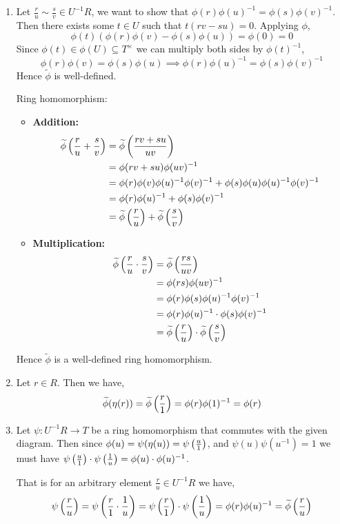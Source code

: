 \documentclass[Notebook.tex]{subfiles}
\begin{document}
\begin{solution}
	\bbni 
	\begin{enumerate}
		\item Let $\frac{r}{u} \sim \frac{s}{v} \in U^{-1}R$, we want to show that $\phi(r) \phi(u)^{-1} = \phi(s)\phi(v)^{-1}$. Then there exists some $t \in U$ such that $t(rv - su) = 0$. Applying ${\phi}$,
		\[\phi(t)(\phi(r) \phi(v) - \phi(s) \phi(u)) = \phi(0) = 0\]
		Since $\phi(t) \in \phi(U) \subseteq T^\times$ we can multiply both sides by $\phi(t)^{-1}$, 
		\[\phi(r) \phi(v) = \phi(s) \phi(u) \implies \phi(r) \phi(u)^{-1} = \phi(s) \phi(v)^{-1} \]
		Hence $\widetilde{\phi}$ is well-defined. 

		Ring homomorphism: 
		\begin{itemize}
			\item \textbf{Addition:}
			\begin{align*}
				\widetilde{\phi}\left (\frac{r}{u}+\frac{s}{v} \right ) &= \widetilde{\phi}\left(\frac{rv + su}{uv}\right) \\
				&= \phi(rv + su) \phi(uv)^{-1} \\
				&= \phi(r)\phi(v)\phi(u)^{-1}\phi(v)^{-1}+\phi(s)\phi(u)\phi(u)^{-1}\phi(v)^{-1} \\ 
				&= \phi(r)\phi(u)^{-1}  + \phi(s) \phi(v)^{-1} \\
				&= \widetilde{\phi}\left(\frac{r}{u}\right) + \widetilde{\phi} \left(\frac{s}{v}\right)
			\end{align*}  
			\item \textbf{Multiplication:}
			\begin{align*}
				\widetilde{\phi}\left (\frac{r}{u} \cdot \frac{s}{v} \right ) &= \widetilde{\phi}\left(\frac{rs}{uv}\right) \\
				&= \phi(rs) \phi(uv)^{-1} \\
				&= \phi(r)\phi(s)\phi(u)^{-1}\phi(v)^{-1} \\
				&= \phi(r)\phi(u)^{-1}  \cdot  \phi(s) \phi(v)^{-1} \\
				&= \widetilde{\phi}\left(\frac{r}{u}\right) \cdot \widetilde{\phi} \left(\frac{s}{v}\right)
			\end{align*}  
		\end{itemize}
		Hence $\widetilde{\phi}$ is a well-defined ring homomorphism. 

		\item Let $r \in R$. Then we have, 
		\[\widetilde{\phi}(\eta(r)) = \widetilde{\phi}\left(\frac{r}{1}\right) = \phi(r) \phi(1)^{-1} = \phi(r)\]

		\item Let $\psi: U^{-1}R \to T$ be a ring homomorphism that commutes with the given diagram. Then since $\phi(u) = \psi(\eta(u)) = \psi\left(\frac{u}{1}\right)$, and $\psi(u) \psi(u^{-1})= 1$ we must have $\psi\left(\frac{u}{1}\right) \cdot \psi\left(\frac{1}{u}\right) = \phi(u) \cdot \phi(u)^{-1}$. 
		
		That is for an arbitrary element $\frac{r}{u} \in U^{-1}R$ we have, 
		\[\psi\left(\frac{r}{u}\right) = \psi \left( \frac{r}{1} \cdot \frac{1}{u}\right) = \psi\left(\frac{r}{1}\right) \cdot \psi \left(\frac{1}{u}\right) = \phi(r) \phi(u)^{-1} = \widetilde{\phi} \left(\frac{r}{u}\right)\]
	\end{enumerate}
\end{solution}
\end{document}
